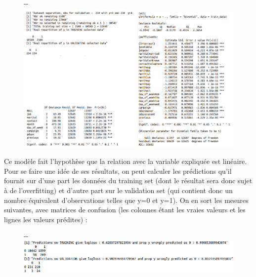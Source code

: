 \documentclass[]{article}
\begin{document}
\begin{figure}[!ht]
   \begin{adjustwidth}{-\oddsidemargin-1in}{-\rightmargin}
     \centering
     \includegraphics[width=\paperwidth - 1cm]{callglm}
   \end{adjustwidth}
\end{figure}
\vspace{0.3cm}
Ce modèle fait l'hypothèse que la relation avec la variable expliquée est linéaire. Pour se faire une idée de ses résultats, on peut calculer les prédictions qu'il fournit sur d'une part les données du training set (dont le résultat sera donc sujet à de l'overfitting) et d'autre part sur le validation set (qui contient donc un nombre équivalent d'observations telles que y=0 et y=1). On en sort les mesures suivantes, avec matrices de confusion (les colonnes étant les vraies valeurs et les lignes les valeurs prédites) :

\begin{figure}[!ht]
   \begin{adjustwidth}{-\oddsidemargin-1in}{-\rightmargin}
     \centering
     \includegraphics[width=\textwidth]{confmat}
   \end{adjustwidth}
\end{figure}

\newpage
\end{document}
